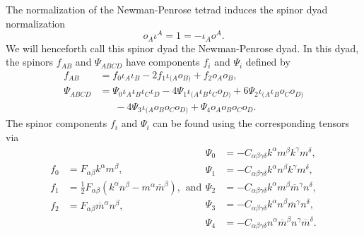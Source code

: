	The normalization of the Newman-Penrose tetrad induces the spinor dyad normalization
	\begin{equation}  
	o_{A}\iota^{A} = 1 = -\iota_{A}o^{A}.
	\end{equation}
	We will henceforth call this spinor dyad the Newman-Penrose dyad. In this dyad, the spinors $f_{AB}$ and
	$\Psi_{ABCD}$ have components $f_{i}$ and $\Psi_{i}$ defined by
	\begin{subequations}
		\begin{align}  
		f_{AB} &= f_{0} \iota_{A} \iota_{B} - 2f_{1} \iota_{(A} o_{B)} + f_{2} o_{A} o_{B}, \label{Expansion:eqn:app:maxwellscalarfull} \\
		\Psi_{ABCD} &= \Psi_{0} \iota_{A} \iota_{B} \iota_{C} \iota_{D} - 4 \Psi_{1} \iota_{(A} \iota_{B} \iota_{C}
		o_{D)} + 6 \Psi_{2} \iota_{(A} \iota_{B} o_{C} o_{D)} \nonumber \\
		&\phantom{=\ } - 4 \Psi_{3} \iota_{(A} o_{B} o_{C} o_{D)} + \Psi_{4}
		o_{A} o_{B} o_{C} o_{D}.
		\end{align}
	\end{subequations}
	The spinor components $f_{i}$ and $\Psi_{i}$ can be found using the corresponding tensors via
	\begin{subequations}
		\begin{align} 
		f_{0} &= F_{\alpha \beta} k^{\alpha} m^{\beta}, \\
		f_{1} &= \frac{1}{2} F_{\alpha \beta} \left( k^{\alpha} n^{\beta} - m^{\alpha} \overline{m}^{\beta}\right)
		,\\
		f_{2} &= F_{\alpha \beta} \overline{m}^{\alpha} n^{\beta} ,
		\end{align}
		\text{and}
		\begin{align} 
		\Psi_{0} &= -C_{\alpha \beta \gamma \delta} k^{\alpha} m^{\beta} k^{\gamma} m^{\delta}, \\
		\Psi_{1} &= -C_{\alpha \beta \gamma \delta} k^{\alpha} n^{\beta} k^{\gamma} m^{\delta},\\
		\Psi_{2} &= -C_{\alpha \beta \gamma \delta} k^{\alpha} m^{\beta} \overline{m}^{\gamma} n^{\delta}, \\
		\Psi_{3} &= -C_{\alpha \beta \gamma \delta} k^{\alpha} n^{\beta} \overline{m}^{\gamma} n^{\delta}, \\
		\Psi_{4} &= -C_{\alpha \beta \gamma \delta} n^{\alpha} \overline{m}^{\beta} n^{\gamma}
		\overline{m}^{\delta}. \label{Expansion:eqn:app:Weylscalar4}
		\end{align}
	\end{subequations}
	
